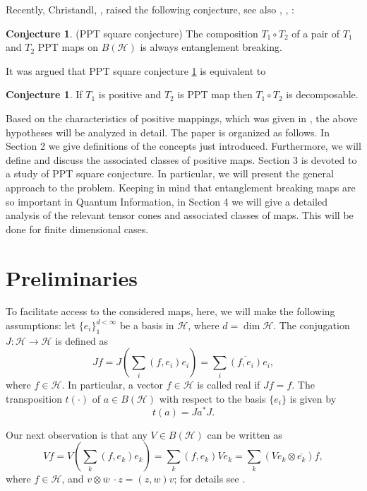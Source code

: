 \documentclass{amsart}
\theoremstyle{plain}
\theoremstyle{definition}
\newtheorem{con}[thm]{Conjecture}
\newcommand{\cH}{\mathcal{H}}
\begin{document}
Recently, Christandl, \cite{R}, raised the following conjecture, see also \cite{B}, \cite{BCHW}, \cite{KS}:
\begin{con} (PPT square conjecture)
\label{1}
The composition $T_1 \circ T_2$ of a pair of
$T_1$ and $T_2$ PPT maps on $B(\cH)$ is always  entanglement breaking.
\end{con}

It was argued that PPT square conjecture \ref{1} is equivalent to
\begin{con} \cite{ChMW}
\label{2}
If $T_1$ is positive and $T_2$ is PPT map then $T_1 \circ T_2$ is decomposable.
\end{con}

Based on the characteristics of positive mappings, which was given in \cite{Maj}, the above hypotheses will be analyzed in detail. The paper is organized as follows.
In Section 2 we give  definitions of the concepts just introduced. Furthermore, we will define and discuss the associated classes of positive maps.  Section 3 is devoted  to a study of PPT square conjecture.  In particular, we will present the general approach to the problem. Keeping in mind that entanglement breaking maps are so important in Quantum Information, in Section 4 we will give a detailed analysis of the relevant tensor cones  and associated classes  of maps. This will be done  for finite dimensional cases. 
 
\section{Preliminaries}

To facilitate access to the considered maps,  here, we will make the following assumptions:  let $\{e_i\}_1^{d < \infty}$ be a basis in $\cH$, where $d = \dim \cH$. The conjugation $J: \cH \to \cH$ is defined as
\begin{equation}
J f = J \left(\sum_i (f,e_i) e_i\right) = \sum_i \overline{(f,e_i)} e_i,
\end{equation}
where $f\in \cH$. In particular, a vector  $f\in \cH$ is called real if $Jf =f$. The transposition $t(\cdot)$ of $a \in B(\cH)$ with respect to the basis $\{e_i\}$ is given by
\begin{equation}
t(a) = J a^* J.
\end{equation}

Our next observation is that any $V \in B(\cH)$ can be written as
\begin{equation}
Vf = V\left(\sum_k (f,e_k)e_k\right) = \sum_k (f,e_k) Ve_k = \sum_k
\left(Ve_k \otimes \overline{e_k}\right) f,
\end{equation}
where  $f \in \cH$, and $v \otimes \overline{w} 
\ \cdot z = (z,w) v$; for details see \cite{Sch}.
\end{document}
